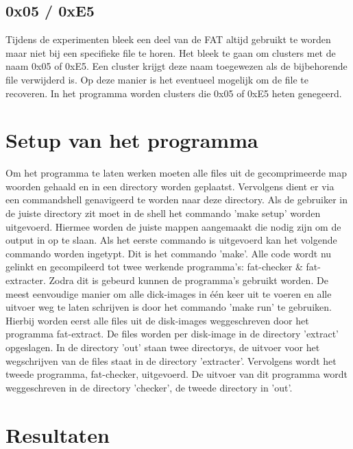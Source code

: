 \documentclass[11pt]{article}
\begin{document}
	\subsection{0x05 / 0xE5}\label{sec:0xE5}
	Tijdens de experimenten bleek een deel van de FAT altijd gebruikt te worden maar niet bij een specifieke file te horen. Het bleek te gaan om clusters met de naam 0x05 of 0xE5. Een cluster krijgt deze naam toegewezen als de bijbehorende file verwijderd is. Op deze manier is het eventueel mogelijk om de file te recoveren. In het programma worden clusters die 0x05 of 0xE5 heten genegeerd. 

	\section{Setup van het programma}\label{sec:setup}
	Om het programma te laten werken moeten alle files uit de gecomprimeerde map woorden gehaald en in een directory worden geplaatst. Vervolgens dient er via een commandshell genavigeerd te worden naar deze directory. Als de gebruiker in de juiste directory zit moet in de shell het commando 'make setup' worden uitgevoerd. 
Hiermee worden de juiste mappen aangemaakt die nodig zijn om de output in op te slaan. Als het eerste commando is uitgevoerd kan het volgende commando worden ingetypt. Dit is het commando 'make'. Alle code wordt nu gelinkt en gecompileerd tot twee werkende programma's: fat-checker \& fat-extracter. Zodra dit is gebeurd kunnen de programma's gebruikt worden. De meest eenvoudige manier om alle dick-images in \'e\'en keer uit te voeren en alle uitvoer weg te laten schrijven is door het commando 'make run' te gebruiken. Hierbij worden eerst alle files uit de disk-images weggeschreven door het programma fat-extract. De files worden per disk-image in de directory 'extract' opgeslagen. In de directory 'out' staan twee directorys, de uitvoer voor het wegschrijven van de files staat in de directory 'extracter'.
Vervolgens wordt het tweede programma, fat-checker, uitgevoerd. De uitvoer van dit programma wordt weggeschreven in de directory 'checker', de tweede directory in 'out'.
	
	\newpage

	\section{Resultaten}\label{sec:result}
	
\end{document}
